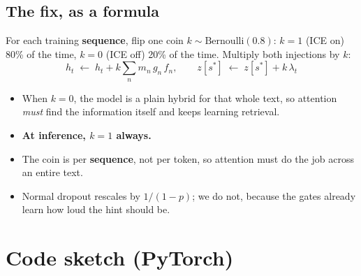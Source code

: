 \documentclass[11pt]{article}
\begin{document}
\subsection*{The fix, as a formula}
For each training \textbf{sequence}, flip one coin $k \sim \mathrm{Bernoulli}(0.8)$:
$k = 1$ (ICE on) 80\% of the time, $k = 0$ (ICE off) 20\% of the time. Multiply both injections by $k$:
\[
\boxed{\, h_t \;\leftarrow\; h_t + k \sum_{n} m_n\, g_n\, f_n, \qquad z[s^*] \;\leftarrow\; z[s^*] + k\, \lambda_t \,}
\]
\begin{itemize}
  \item When $k = 0$, the model is a plain hybrid for that whole text, so attention \emph{must} find the information itself and keeps learning retrieval.
  \item \textbf{At inference, $k = 1$ always.}
  \item The coin is per \textbf{sequence}, not per token, so attention must do the job across an entire text.
  \item Normal dropout rescales by $1/(1-p)$; we do not, because the gates already learn how loud the hint should be.
\end{itemize}

\section{Code sketch (PyTorch)}
\end{document}
